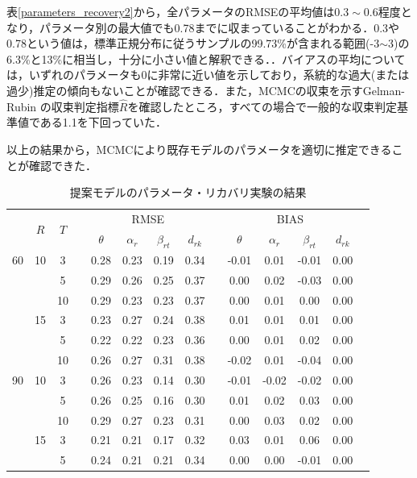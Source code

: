 \documentclass[a4paper,11pt,oneside,openany]{jsbook}
\newcommand{\bhline}[1]{\noalign{\hrule height #1}}
\begin{document}
表\ref{parameters_recovery2}から，全パラメータのRMSEの平均値は$0.3\sim0.6$程度となり，パラメータ別の最大値でも0.78までに収まっていることがわかる．0.3や0.78という値は，標準正規分布に従うサンプルの99.73\%が含まれる範囲(-3$\sim$3)の6.3\%と13\%に相当し，十分に小さい値と解釈できる．．バイアスの平均については，いずれのパラメータも0に非常に近い値を示しており，系統的な過大(または過少)推定の傾向もないことが確認できる．また，MCMCの収束を示すGelman-Rubin の収束判定指標$ \hat{R} $\cite{RhatRubin,RhatCarlin}を確認したところ，すべての場合で一般的な収束判定基準値である1.1を下回っていた．

以上の結果から，MCMCにより既存モデルのパラメータを適切に推定できることが確認できた．

\begin{table}[tb]
\begin{center}
\caption{提案モデルのパラメータ・リカバリ実験の結果}
\setlength{\tabcolsep}{5.pt}
\begin{tabular}{cccccccccccccc}  
\bhline{1pt}
\multirow{2}{*}{$J$} & \multirow{2}{*}{$R$} & \multirow{2}{*}{$T$}  && \multicolumn{4}{c}{RMSE} &&   \multicolumn{4}{c}{BIAS}  \\
\cline{5-8}\cline{10-13}
  & & & & $\theta$ & $\alpha_r$ & $\beta_{rt}$ & $d_{rk}$ &  & $\theta$ & $\alpha_r$ & $\beta_{rt}$ & $d_{rk}$ \\
\bhline{1pt}
60 & 10 & 3  && 0.28 & 0.23 & 0.19 & 0.34 && -0.01 & 0.01 & -0.01 & 0.00 \\
   &    & 5  && 0.29 & 0.26 & 0.25 & 0.37 && 0.00  & 0.02 & -0.03 & 0.00 \\
   &    & 10 && 0.29 & 0.23 & 0.23 & 0.37 && 0.00  & 0.01 & 0.00  & 0.00 \\
\cline{2-14}
   & 15 & 3  && 0.23 & 0.27 & 0.24 & 0.38 && 0.01  & 0.01 & 0.01  & 0.00 \\
   &    & 5  && 0.22 & 0.22 & 0.23 & 0.36 && 0.00  & 0.01 & 0.02  & 0.00 \\
   &    & 10 && 0.26 & 0.27 & 0.31 & 0.38 && -0.02 & 0.01 & -0.04 & 0.00 \\
\hline
90 & 10 & 3  && 0.26 & 0.23 & 0.14 & 0.30 && -0.01 & -0.02 & -0.02 & 0.00 \\
   &    & 5  && 0.26 & 0.25 & 0.16 & 0.30 && 0.01  & 0.02  & 0.03  & 0.00 \\
   &    & 10 && 0.29 & 0.27 & 0.23 & 0.31 && 0.00  & 0.03  & 0.02  & 0.00 \\
\cline{2-14}
& 15 & 3  && 0.21 & 0.21 & 0.17 & 0.32 && 0.03  & 0.01 & 0.06  & 0.00 \\
&    & 5  && 0.24 & 0.21 & 0.21 & 0.34 && 0.00  & 0.00 & -0.01 & 0.00\\

\end{tabular}
\end{center}
\end{table}
\end{document}
